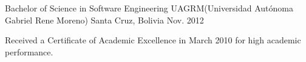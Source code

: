 \begin{cventries}
  \cventry
    {Bachelor of Science in Software Engineering }
    {UAGRM(Universidad Autónoma Gabriel Rene Moreno)}
    {Santa Cruz, Bolivia}
    {Nov. 2012}
    {
      \begin{cvitems}
        \item {Received a Certificate of Academic Excellence in March 2010 for high academic performance.
        }
      \end{cvitems}
    }
\end{cventries}
